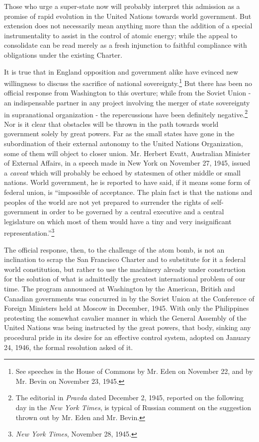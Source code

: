 Those who urge a super-state now will probably interpret this admission as a promise of rapid evolution in the United Nations towards world government. But extension does not necessarily mean anything more than the addition of a special instrumentality to assist in the control of atomic energy; while the appeal to consolidate can be read merely as a fresh injunction to faithful compliance with obligations under the existing Charter.

It is true that in England opposition and government alike have evinced new willingness to discuss the sacrifice of national sovereignty.\footnote{See speeches in the House of Commons by Mr. Eden on November 22, and by Mr. Bevin on November 23, 1945.} But there has been no official response from Washington to this overture; while from the Soviet Union - an indispensable partner in any project involving the merger of state sovereignty in supranational organization - the repercussions have been definitely negative.\footnote{The editorial in \textit{Pravda} dated December 2, 1945, reported on the following day in the \textit{New York Times}, is typical of Russian comment on the suggestion thrown out by Mr. Eden and Mr. Bevin.} Nor is it clear that obstacles will be thrown in the path towards world government solely by great powers. Far as the small states have gone in the subordination of their external autonomy to the United Nations Organization, some of them will object to closer union. Mr. Herbert Evatt, Australian Minister of External Affairs, in a speech made in New York on November 27, 1945, issued a \emph{caveat} which will probably be echoed by statesmen of other middle or small nations. World government, he is reported to have said, if it means some form of federal union, is ``impossible of acceptance. The plain fact is that the nations and peoples of the world are not yet prepared to surrender the rights of self-government in order to be governed by a central executive and a central legislature on which most of them would have a tiny and very insignificant representation.''\footnote{\textit{New York Times}, November 28, 1945.}

The official response, then, to the challenge of the atom bomb, is not an inclination to scrap the San Francisco Charter and to substitute for it a federal world constitution, but rather to use the machinery already under construction for the solution of what is admittedly the greatest international problem of our time. The program announced at Washington by the American, British and Canadian governments was concurred in by the Soviet Union at the Conference of Foreign Ministers held at Moscow in December, 1945. With only the Philippines protesting the somewhat cavalier manner in which the General Assembly of the United Nations was being instructed by the great powers, that body, sinking any procedural pride in its desire for an effective control system, adopted on January 24, 1946, the formal resolution asked of it.

